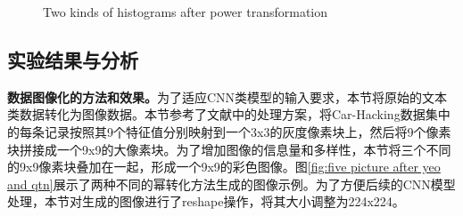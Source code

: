 \begin{figure}[htb]
    \centering
    \caption{Two kinds of histograms after power transformation}
     \label{fig:Two kinds of histograms after power transformation}
\end{figure}

\subsection{实验结果与分析}\label{subsection:Generating_images}

\textbf{数据图像化的方法和效果。}\label{subsection:Data_imageization}为了适应CNN类模型的输入要求，本节将原始的文本类数据转化为图像数据。本节参考了文献\cite{A_Transfer_Learning_and_Optimized_CNN_Based_Intrusion_Detection_System_for_Internet_of_Vehicles}中的处理方案，将Car-Hacking数据集中的每条记录按照其9个特征值分别映射到一个3x3的灰度像素块上，然后将9个像素块拼接成一个9x9的大像素块。为了增加图像的信息量和多样性，本节将三个不同的9x9像素块叠加在一起，形成一个9x9的彩色图像。图\ref{fig:five picture after yeo and qtn}展示了两种不同的幂转化方法生成的图像示例。为了方便后续的CNN模型处理，本节对生成的图像进行了reshape操作，将其大小调整为224x224。

